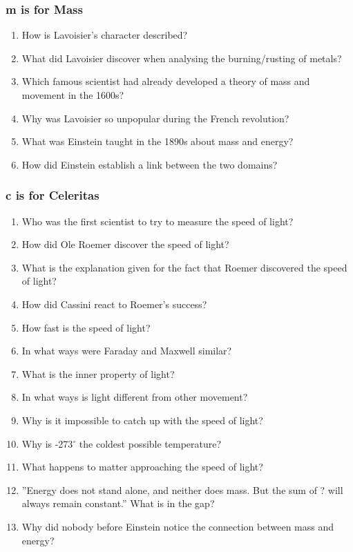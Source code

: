 \subsubsection*{m is for Mass}
\begin{enumerate}  
\item How is Lavoisier’s character described?
\item What did Lavoisier discover when analysing the burning/rusting of metals?
\item Which famous scientist had already developed a theory of mass and movement in the 1600s?
\item Why was Lavoisier so unpopular during the French revolution?
\item What was Einstein taught in the 1890s about mass and energy?
\item How did Einstein establish a link between the two domains?
\end{enumerate}

\subsubsection*{c is for Celeritas}
\begin{enumerate}  
\item Who was the first scientist to try to measure the speed of light?
\item How did Ole Roemer discover the speed of light?
\item What is the explanation given for the fact that Roemer discovered the speed of light?
\item How did Cassini react to Roemer’s success?
\item How fast is the speed of light?
\item In what ways were Faraday and Maxwell similar?
\item What is the inner property of light?
\item In what ways is light different from other movement?
\item Why is it impossible to catch up with the speed of light?
\item Why is -273${^\circ}$ the coldest possible temperature?
\item What happens to matter approaching the speed of light?
\item ''Energy does not stand alone, and neither does mass. But the sum of ? will always remain constant.'' What is in the gap?
\item Why did nobody before Einstein notice the connection between mass and energy?
\end{enumerate}

